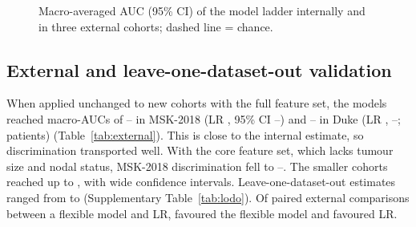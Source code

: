 \begin{table}[htbp]\centering\small
\caption{Internal validation in METABRIC (nested, \Repeats$\times$ repeated stratified \Folds-fold
cross-validation; full feature set). Point estimates are means over repeats; 95\% CIs are
patient-level bootstraps (\Boot{} resamples) of repeat-averaged out-of-fold predictions. $\Delta$ is
the paired-bootstrap difference in macro-AUC versus multinomial LR. QWK = quadratic-weighted
$\kappa$.}\label{tab:internal}
\tabfit{}
\end{table}

\begin{figure}[htbp]\centering
\resizebox{\linewidth}{!}{}
\caption{Macro-averaged AUC (95\% CI) of the model ladder internally and in three external cohorts;
dashed line = chance.}\label{fig:ladder}
\end{figure}

\subsection{External and leave-one-dataset-out validation}
When applied unchanged to new cohorts with the full feature set, the models reached macro-AUCs of
\FullMskMin--\FullMskMax{} in MSK-2018 (LR \MlrExtAuc, 95\% CI \MlrMskAucLo--\MlrMskAucHi) and
\FullDukeMin--\FullDukeMax{} in Duke (LR \MlrDukeAuc, \MlrDukeAucLo--\MlrDukeAucHi; \NDukeExt{}
patients) (Table~\ref{tab:external}). This is close to the internal estimate, so discrimination
transported well. With the core feature set, which lacks tumour size and nodal status, MSK-2018
discrimination fell to \CoreMskMin--\CoreMskMax. The smaller cohorts reached up to \CoreExtAucMax,
with wide confidence intervals. Leave-one-dataset-out estimates ranged from \LodoAucMin{} to
\LodoAucMax{} (Supplementary Table~\ref{tab:lodo}). Of \NExtComparisons{} paired external
comparisons between a flexible model and LR, \NExtSigBetter{} favoured the flexible model and
\NExtSigWorse{} favoured LR.

\begin{table}[htbp]\centering\small
\caption{External validation of models developed in METABRIC and applied without refitting.
Calibration slope is for P(grade 3).}\label{tab:external}
\tabfit{}
\end{table}

